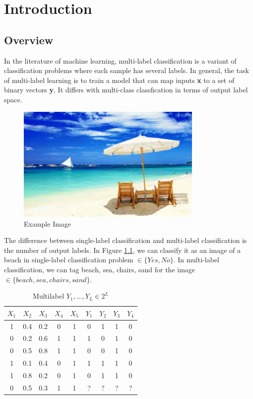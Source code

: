 
\chapter{Introduction} %
\label{Chapter5}

\section{Overview}

In the literature of machine learning, multi-label classification is a variant of classification problems where each sample has several labels. In general, the task of multi-label learning is to train a model that can map inputs \textbf{x} to a set of binary vectors \textbf{y}. It differs with multi-class classfication in terms of output label space.

\graphicspath{ {./Figures/} }
\begin{figure}[!htb]
    \centering
	\includegraphics[width=0.8\textwidth]{beach.jpg}
    \caption{Example Image}%
    \label{fig:MultilableImage}%
\end{figure}

The difference between single-label classification and multi-label classification is the number of output labels. In Figure \ref{fig:MultilableImage}, we can classify it as an image of a beach in single-label classification problem $\in \{Yes, No\}$. In multi-label classification, we can tag beach, sea, chairs, sand for the image $\in \{beach, sea, chairs, sand\}$.

\begin{table}
\centering
\begin{tabular}{|c c c c c | c c c c|}
\hline
$X_{1}$ & $X_{2}$ &  $X_{3}$ & $X_{4}$ & $X_{5}$ & $Y_{1}$ & $Y_{2}$ & $Y_{3}$ & $Y_{4}$ \\
\hline
1 & 0.4 & 0.2 & 0 & 1 & 0 & 1 & 1 & 0 \\
0 & 0.2 & 0.6 & 1 & 1 & 1 & 0 & 1 & 0 \\
0 & 0.5 & 0.8 & 1 & 1 & 0 & 0 & 1 & 0 \\
1 & 0.1 & 0.4 & 0 & 1 & 1 & 1 & 1 & 0 \\
1 & 0.8 & 0.2 & 0 & 1 & 0 & 1 & 1 & 0 \\
\hline
0 & 0.5 & 0.3 & 1 & 1 & ? & ? & ? & ? \\
\hline
\end{tabular}
\caption{Multilabel $Y_{1},...,Y_{L} \in 2^L$}
\label{tab:MultilabelTable}
\end{table}

